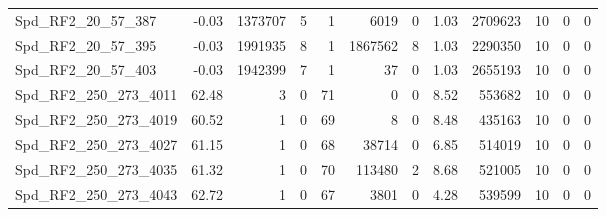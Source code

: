 \begin{longtable}[c]{@{}lrrrrrrrrrrr@{}}
Spd\_RF2\_20\_57\_387         & -0.03                  & 1373707                 & 5                       & 1                      & 6019                    & 0                       & 1.03                    & 2709623                  & 10                       & 0                        & 0                        \\
Spd\_RF2\_20\_57\_395         & -0.03                  & 1991935                 & 8                       & 1                      & 1867562                 & 8                       & 1.03                    & 2290350                  & 10                       & 0                        & 0                        \\
Spd\_RF2\_20\_57\_403         & -0.03                  & 1942399                 & 7                       & 1                      & 37                      & 0                       & 1.03                    & 2655193                  & 10                       & 0                        & 0                        \\
Spd\_RF2\_250\_273\_4011      & 62.48                  & 3                       & 0                       & 71                     & 0                       & 0                       & 8.52                    & 553682                   & 10                       & 0                        & 0                        \\
Spd\_RF2\_250\_273\_4019      & 60.52                  & 1                       & 0                       & 69                     & 8                       & 0                       & 8.48                    & 435163                   & 10                       & 0                        & 0                        \\
Spd\_RF2\_250\_273\_4027      & 61.15                  & 1                       & 0                       & 68                     & 38714                   & 0                       & 6.85                    & 514019                   & 10                       & 0                        & 0                        \\
Spd\_RF2\_250\_273\_4035      & 61.32                  & 1                       & 0                       & 70                     & 113480                  & 2                       & 8.68                    & 521005                   & 10                       & 0                        & 0                        \\
Spd\_RF2\_250\_273\_4043      & 62.72                  & 1                       & 0                       & 67                     & 3801                    & 0                       & 4.28                    & 539599                   & 10                       & 0                        & 0                        \\

\end{longtable}
